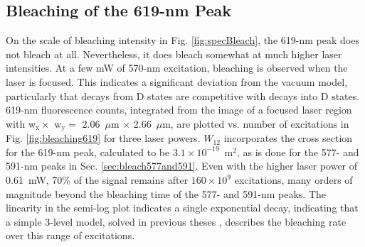 

\subsection{Bleaching of the 619-nm Peak}


On the scale of bleaching intensity in Fig. \ref{fig:specBleach}, the 619-nm peak does not bleach at all.  Nevertheless, it does bleach somewhat at much higher laser intensities.  At a few mW of 570-nm excitation, bleaching is observed when the laser is focused.  This indicates a significant deviation from the vacuum model, particularly that decays from D states are competitive with decays into D states.  619-nm fluorescence counts, integrated from the image of a focused laser region with w$_{\text{x}} \times$ w$_{\text{y}} =$ 2.06~$\mu$m $\times$ 2.66~$\mu$m, are plotted vs. number of excitations in Fig. \ref{fig:bleaching619} for three laser powers.  $W_{12}$ incorporates the cross section for the 619-nm peak, calculated to be $3.1 \times 10^{-19}$~m$^{2}$, as is done for the 577- and 591-nm peaks in Sec. \ref{sec:bleach577and591}.  Even with the higher laser power of 0.61~mW, 70\% of the signal remains after $160 \times 10^{9}$ excitations, many orders of magnitude beyond the bleaching time of the 577- and 591-nm peaks.  The linearity in the semi-log plot indicates a single exponential decay, indicating that a simple 3-level model, solved in previous theses \cite{Brian,Shon}, describes the bleaching rate over this range of excitations.


